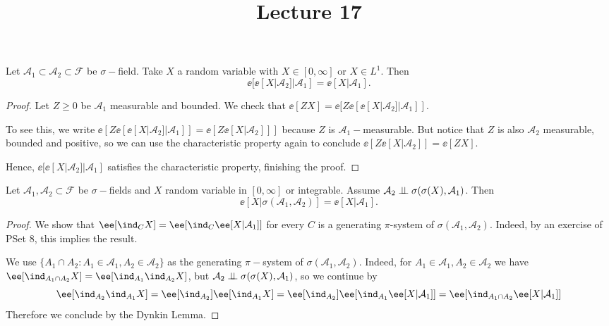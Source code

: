 \documentclass[../main.tex]{subfiles}
\title{Lecture 17}
\begin{document}
\begin{proposition}
  Let $\mathcal{A}_1 \subset \mathcal{A}_2 \subset \mathcal{F}$ be $\sigma-$field. Take 
  $X$ a random variable with $X \in [0, \infty]$ or $X \in L^1$. Then
  \[
    \ee[\ee[X | \mathcal{A}_2] | \mathcal{A}_1] = \ee[X | \mathcal{A}_1]
  .\] 
\end{proposition}
\begin{proof}
    Let $Z \geq 0$ be $\mathcal{A}_1$ measurable and bounded. We check that
    $\ee[ZX] = \ee[Z\ee[\ee[X | \mathcal{A}_2] | \mathcal{A}_1]]$.

    To see this, we write
    $\ee[Z\ee[\ee[X | \mathcal{A}_2] | \mathcal{A}_1]] = \ee[Z \ee[X |
    \mathcal{A}_2]]]$ because $Z$ is $\mathcal{A}_1-$measurable. But notice that
    $Z$ is also $\mathcal{A}_2$ measurable, bounded and positive, so we can use
    the characteristic property again to conclude $\ee[Z \ee[X | \mathcal{A}_2]]
    = \ee[ZX]$.

    Hence, $\ee[\ee[X | \mathcal{A}_2] | \mathcal{A}_1]$ satisfies the
    characteristic property, finishing the proof.
\end{proof}

\begin{lemma}
    Let $\mathcal{A}_1, \mathcal{A}_2 \subset \mathcal{F}$ be $\sigma-$fields
    and $X$ random variable in $[0, \infty]$ or integrable. Assume
    $\mathcal{A}_2 \perp\!\!\!\!\,\perp \sigma(\sigma(X), \mathcal{A}_1)$. Then
    \[
      \ee[X | \sigma(\mathcal{A}_1, \mathcal{A}_2)] = \ee[X | \mathcal{A}_1]
    .\] 
\end{lemma}
\begin{proof}
  We show that $\ee[\ind_C X] = \ee[\ind_C \ee[X | \mathcal{A}_1]]$ for every
  $C$ is a generating $\pi$-system of $\sigma(\mathcal{A}_1, \mathcal{A}_2)$.
  Indeed, by an exercise of PSet 8, this implies the result.

  We use $\{ A_1 \cap A_2 \colon A_1 \in \mathcal{A}_1, A_2 \in \mathcal{A}_2 \}
  $ as the generating $\pi-$system of $\sigma(\mathcal{A}_1, \mathcal{A}_2)$.
  Indeed, for $A_1 \in \mathcal{A}_1, A_2 \in \mathcal{A}_2$ we have 
  $\ee[\ind_{A_1 \cap A_2} X] = \ee[\ind_{A_1} \ind_{A_2} X]$, but
  $\mathcal{A}_2 \perp\!\!\!\!\,\perp \sigma(\sigma(X), \mathcal{A}_1)$, so 
  we continue by 
  $$\ee[\ind_{A_2} \ind_{A_1} X] = \ee[\ind_{A_2}] \ee[\ind_{A_1}
  X] = \ee[\ind_{A_2}] \ee[\ind_{A_1} \ee[X | \mathcal{A}_1]] = \ee[\ind_{A_1
  \cap A_2} \ee[X | \mathcal{A}_1]]$$
  Therefore we conclude by the Dynkin Lemma.
\end{proof}
\end{document}
